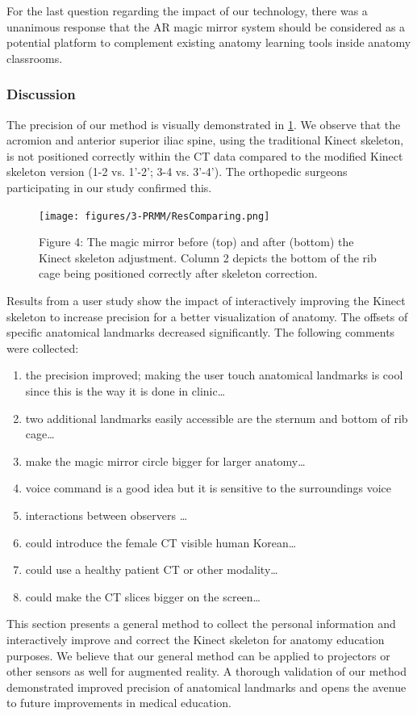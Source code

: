 For the last question regarding the impact of our technology, there was a unanimous response that the AR magic mirror system should be considered as a potential platform to complement existing anatomy learning tools inside anatomy classrooms. 

\subsubsection{Discussion}
The precision of our method is visually demonstrated in \figurename{\ref{fig:3-PRMM:ResComparing}}. We observe that the acromion and anterior superior iliac spine, using the traditional Kinect skeleton, is not positioned correctly within the CT data compared to the modified Kinect skeleton version (1-2 vs. 1'-2'; 3-4 vs. 3'-4'). The orthopedic surgeons participating in our study confirmed this.
\begin{figure}[htb]
	\centering
	\texttt{[image: figures/3-PRMM/ResComparing.png]}
	\caption{Figure 4:	The magic mirror before (top) and after (bottom) the Kinect skeleton adjustment. Column 2 depicts the bottom of the rib cage being positioned correctly after skeleton correction.}
	\label{fig:3-PRMM:ResComparing}
\end{figure}
Results from a user study show the impact of interactively improving the Kinect skeleton to increase precision for a better visualization of anatomy. The offsets of specific anatomical landmarks decreased significantly. The following comments were collected:
\begin{enumerate}
	\item the precision improved; making the user touch anatomical landmarks is cool since this is the way it is done in clinic…
	\item two additional landmarks easily accessible are the sternum and bottom of rib cage…
	\item make the magic mirror circle bigger for larger anatomy…
	\item voice command is a good idea but it is sensitive to the surroundings voice
	\item interactions between observers …
	\item could introduce the female CT visible human Korean…
	\item could use a healthy patient CT or other modality…
	\item could make the CT slices bigger on the screen…
\end{enumerate}

This section presents a general method to collect the personal information and interactively improve and correct the Kinect skeleton for anatomy education purposes. We believe that our general method can be applied to projectors or other sensors as well for augmented reality. A thorough validation of our method demonstrated improved precision of anatomical landmarks and opens the avenue to future improvements in medical education.